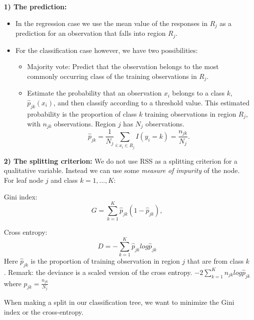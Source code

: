 \documentclass[ignorenonframetext,]{beamer}
\providecommand{\tightlist}{%
  \setlength{\itemsep}{0pt}\setlength{\parskip}{0pt}}
\begin{document}
\begin{frame}

\textbf{1) The prediction:}

\begin{itemize}
\tightlist
\item
  In the regression case we use the mean value of the responses in
  \(R_j\) as a prediction for an observation that falls into region
  \(R_j\).
\item
  For the classification case however, we have two possibilities:

  \begin{itemize}
  \tightlist
  \item
    Majority vote: Predict that the observation belongs to the most
    commonly occurring class of the training observations in \(R_j\).\\
  \item
    Estimate the probability that an observation \(x_i\) belongs to a
    class \(k\), \(\hat{p}_{jk}(x_i)\), and then classify according to a
    threshold value. This estimated probability is the proportion of
    class \(k\) training observations in region \(R_j\), with \(n_{jk}\)
    observations. Region \(j\) has \(N_j\) observations.
    \[\hat{p}_{jk} = \frac{1}{N_j} \sum_{i:x_i \in R_j} I(y_i = k)=\frac{n_{jk}}{N_j}.\]
  \end{itemize}
\end{itemize}

\end{frame}

\begin{frame}

\textbf{2) The splitting criterion:} We do not use RSS as a splitting
criterion for a qualitative variable. Instead we can use some
\emph{measure of impurity} of the node. For leaf node \(j\) and class
\(k=1,\ldots, K\):

Gini index: \[
G=\sum_{k=1}^K \hat{p}_{jk}(1-\hat{p}_{jk}),
\]

Cross entropy: \[
D=-\sum_{k=1}^K \hat{p}_{jk}log\hat{p}_{jk}
\] Here \(\hat{p}_{jk}\) is the proportion of training observation in
region \(j\) that are from class \(k\). Remark: the deviance is a scaled
version of the cross entropy. \(-2\sum_{k=1}^K n_{jk} log\hat{p}_{jk}\)
where \(\hat{p}_{jk}=\frac{n_{jk}}{N_j}\)

When making a split in our classification tree, we want to minimize the
Gini index or the cross-entropy.

\end{frame}
\end{document}
